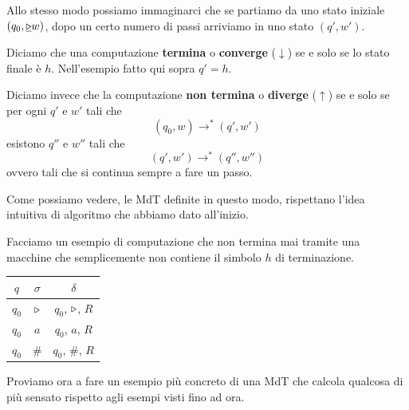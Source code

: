 Allo stesso modo possiamo immaginarci che se partiamo da uno
stato iniziale $(q_0, \underline{\triangleright} w)$, dopo un certo
numero di passi arriviamo in uno stato $(q', w')$.

\begin{definition}
	Diciamo che una computazione \textbf{termina} o
	\textbf{converge} ($\downarrow$) se e solo se lo stato
	finale è $h$. Nell'esempio fatto qui sopra $q' = h$.

	Diciamo invece che la computazione \textbf{non termina}
	o \textbf{diverge} ($\uparrow$) se e solo se per ogni
	$q'$ e $w'$ tali che
	\[ (q_0, w) \to^* (q', w') \]
	esistono $q''$ e $w''$ tali che
	\[ (q', w') \to^* (q'', w'') \]
	ovvero tali che si continua sempre a fare un passo.
\end{definition}

Come possiamo vedere, le MdT definite in questo modo,
rispettano l'idea intuitiva di algoritmo che abbiamo dato
all'inizio.

\begin{example}
	Facciamo un esempio di computazione che non termina mai
	tramite una macchine che semplicemente non contiene il
	simbolo $h$ di terminazione.
	\begin{center}
		\begin{tabular}{|c|c|c|}
			\hline
			$q$   & $\sigma$ & $\delta$             \\
			\hline
			$q_0$ & $\triangleright$ & $q_0$, $\triangleright$, $R$ \\
			$q_0$ & $a$      & $q_0$, $a$, $R$      \\
			$q_0$ & $\#$     & $q_0$, $\#$, $R$     \\
			\hline
		\end{tabular}
	\end{center}
\end{example}

Proviamo ora a fare un esempio più concreto di una MdT che
calcola qualcosa di più sensato rispetto agli esempi visti
fino ad ora.

